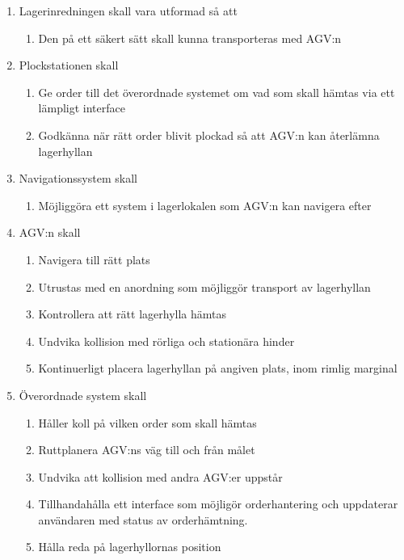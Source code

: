\documentclass[a4paper,11pt]{article}
\begin{document}
\begin{enumerate}
  \item Lagerinredningen skall vara utformad så att
  \begin{enumerate}
    \item Den på ett säkert sätt skall kunna transporteras med AGV:n
  \end{enumerate}

  \item Plockstationen skall
  \begin{enumerate}
    \item Ge order till det överordnade systemet om vad som skall hämtas via ett lämpligt interface
    \item Godkänna när rätt order blivit plockad så att AGV:n kan återlämna lagerhyllan
  \end{enumerate}

  \item Navigationssystem skall
  \begin{enumerate}
    \item Möjliggöra ett system i lagerlokalen som AGV:n kan navigera efter
  \end{enumerate}

  \item AGV:n skall
  \begin{enumerate}
    \item Navigera till rätt plats
    \item Utrustas med en anordning som möjliggör transport av lagerhyllan
    \item Kontrollera att rätt lagerhylla hämtas
    \item Undvika kollision med rörliga och stationära hinder
    \item Kontinuerligt placera lagerhyllan på angiven plats, inom rimlig marginal
  \end{enumerate}

  \item Överordnade system skall
  \begin{enumerate}
    \item Håller koll på vilken order som skall hämtas
    \item Ruttplanera AGV:ns väg till och från målet
    \item Undvika att kollision med andra AGV:er uppstår
    \item Tillhandahålla ett interface som möjligör orderhantering och uppdaterar användaren med status av orderhämtning.
    \item Hålla reda på lagerhyllornas position
  \end{enumerate}
\end{enumerate}
\end{document}
